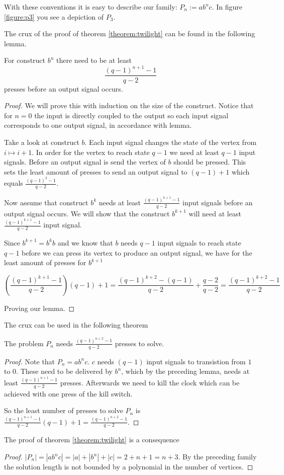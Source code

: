 With these conventions it is easy to describe our family: $P_{n} := ab^{n}c$. In figure \ref{figure:p3} you see a depiction of $P_{3}$.

The crux of the proof of theorem \ref{theorem:twilight} can be found in the following lemma.

\begin{lemma}
  For construct $b^{n}$ there need to be at least
  \[\frac{(q-1)^{n+1} - 1}{q-2}\]
  presses before an output signal occurs.
\end{lemma}

\begin{proof}
  We will prove this with induction on the size of the construct. Notice that for $n=0$ the input is directly coupled to the output so each input signal corresponds to one output signal, in accordance with lemma.

  Take a look at construct $b$. Each input signal changes the state of the vertex from $i \mapsto i+1$. In order for the vertex to reach state $q-1$ we need at least $q-1$ input signals. Before an output signal is send the vertex of $b$ should be pressed. This sets the least amount of presses to send an output signal to $(q-1) + 1$ which equals $\frac{(q-1)^2 - 1}{q-2}$.

  Now assume that construct $b^{k}$ needs at least $\frac{(q-1)^{k+1} - 1}{q-2}$ input signals before an output signal occurs. We will show that the construct $b^{k+1}$ will need at least $\frac{(q-1)^{k+1} - 1}{q-2}$ input signal.

  Since $b^{k+1} = b^{k}b$ and we know that $b$ needs $q-1$ input signals to reach state $q-1$ before we can press its vertex to produce an output signal, we have for the least amount of presses for $b^{k+1}$

  \[
    \left(\frac{(q-1)^{k+1} - 1}{q-2}\right)(q-1) + 1 =
    \frac{(q-1)^{k+2} - (q-1)}{q-2} + \frac{q-2}{q-2} = 
    \frac{(q-1)^{k+2} - 1}{q-2}
  \]

  Proving our lemma.
\end{proof}

The crux can be used in the following theorem

\begin{theorem}
  The problem $P_{n}$ needs $\frac{(q-1)^{n+2} - 1}{q-2}$ presses to solve.
\end{theorem}

\begin{proof}
  Note that $P_{n} = ab^nc$. $c$ needs $(q-1)$ input signals to transistion from $1$ to $0$. These need to be delivered by $b^{n}$, which by the preceding lemma, needs at least $\frac{(q-1)^{n+1} - 1}{q-2}$ presses. Afterwards we need to kill the clock which can be achieved with one press of the kill switch.
  
  So the least number of presses to solve $P_{n}$ is $\frac{(q-1)^{n+1} - 1}{q-2}(q-1) + 1 = \frac{(q-1)^{n+2} - 1}{q-2}$.
\end{proof}

The proof of theorem \ref{theorem:twilight} is a consequence

\begin{proof}
  $|P_{n}| = |ab^{n}c| = |a| + |b^{n}| + |c| = 2 + n + 1 = n + 3$. By the preceding family the solution length is not bounded by a polynomial in the number of vertices.
\end{proof}